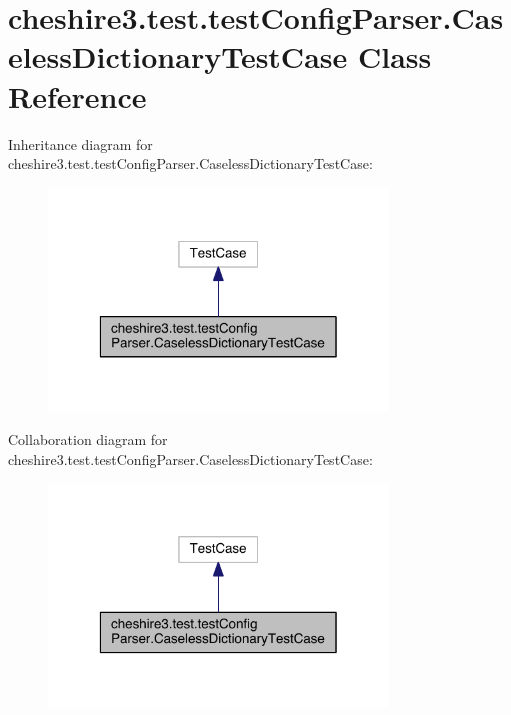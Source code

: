 \hypertarget{classcheshire3_1_1test_1_1test_config_parser_1_1_caseless_dictionary_test_case}{\section{cheshire3.\-test.\-test\-Config\-Parser.\-Caseless\-Dictionary\-Test\-Case Class Reference}
\label{classcheshire3_1_1test_1_1test_config_parser_1_1_caseless_dictionary_test_case}
}


Inheritance diagram for cheshire3.\-test.\-test\-Config\-Parser.\-Caseless\-Dictionary\-Test\-Case\-:
\nopagebreak
\begin{figure}[H]
\begin{center}
\leavevmode
\includegraphics[width=256pt]{classcheshire3_1_1test_1_1test_config_parser_1_1_caseless_dictionary_test_case__inherit__graph}
\end{center}
\end{figure}


Collaboration diagram for cheshire3.\-test.\-test\-Config\-Parser.\-Caseless\-Dictionary\-Test\-Case\-:
\nopagebreak
\begin{figure}[H]
\begin{center}
\leavevmode
\includegraphics[width=256pt]{classcheshire3_1_1test_1_1test_config_parser_1_1_caseless_dictionary_test_case__coll__graph}
\end{center}
\end{figure}
